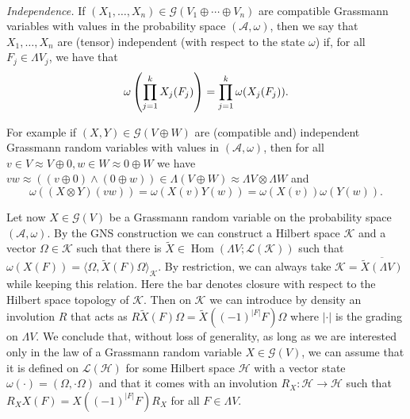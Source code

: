 \documentclass{article}
\newcommand{\tmop}[1]{\ensuremath{\operatorname{#1}}}
\newcommand{\tmtextit}[1]{{\itshape{#1}}}
\begin{document}
\

\tmtextit{Independence.} If $(X_1, \ldots, X_n) \in \mathcal{G} (V_1 \oplus
\cdots \oplus V_n)$ are compatible Grassmann variables with values in the
probability space $(\mathcal{A}, \omega)$, then we say that $X_1, \ldots, X_n$
are (tensor) independent (with respect to the state $\omega$) if, for all $F_j
\in \Lambda V_j$, we have that~{\cite{dirksen_noncommutative_2010}}
\[ \omega \left( \prod_{j = 1}^k \vphantom{\frac{}{}} X_j (F_j) \right) =
   \prod_{j = 1}^k \omega (X_j (F_j)) . \]


For example if $(X, Y) \in \mathcal{G} (V \oplus W)$ are (compatible and)
independent Grassmann random variables with values in $(\mathcal{A}, \omega)$,
then for all $v \in V \approx V \oplus 0, w \in W \approx 0 \oplus W$ we have
$v w \approx ((v \oplus 0) \wedge (0 \oplus w)) \in \Lambda (V \oplus W)
\approx \Lambda V \otimes \Lambda W$ and
\[ \omega ((X \otimes Y) (v w)) = \omega (X (v) Y (w)) = \omega (X (v)) \omega
   (Y (w)) . \]


Let now $X \in \mathcal{G} (V)$ be a Grassmann random variable on the
probability space $(\mathcal{A}, \omega)$. By the GNS construction we can
construct a Hilbert space $\mathcal{K}$ and a vector $\Omega \in \mathcal{K}$
such that there is $\tilde{X} \in \tmop{Hom} (\Lambda V ; \mathcal{L}
(\mathcal{K}))$ such that $\omega (X (F)) = \langle \Omega, \tilde{X} (F)
\Omega \rangle_{\mathcal{K}}$. By restriction, we can always take
$\mathcal{K}= \overline{\tilde{X} (\Lambda V)}$ while keeping this relation.
Here the bar denotes closure with respect to the Hilbert space topology of
$\mathcal{K}$. Then on $\mathcal{K}$ we can introduce by density an involution
$R$ that acts as $R \tilde{X} (F) \Omega = \tilde{X} ((- 1)^{| F |} F) \Omega$
where $| \cdot |$ is the grading on $\Lambda V$. We conclude that, without
loss of generality, as long as we are interested only in the law of a
Grassmann random variable $X \in \mathcal{G} (V)$, we can assume that it is
defined on $\mathcal{L} (\mathcal{H})$ for some Hilbert space $\mathcal{H}$
with a vector state $\omega (\cdot) = (\Omega, \cdot \Omega)$ and that it
comes with an involution $R_X : \mathcal{H} \rightarrow \mathcal{H}$ such that
$R_X X (F) = X ((- 1)^{| F |} F) R_X$ for all $F \in \Lambda V$.

\
\end{document}
